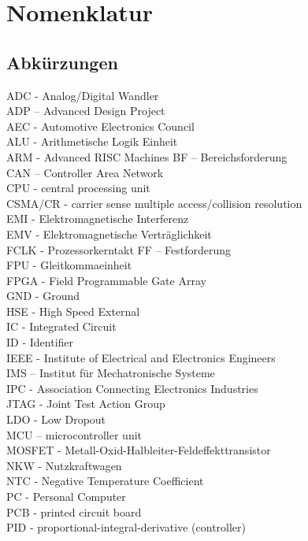 \chapter*{Nomenklatur}
\section*{Abkürzungen}
ADC - Analog/Digital Wandler\\
ADP – Advanced Design Project\\
AEC - Automotive Electronics Council\\
ALU - Arithmetische Logik Einheit\\
ARM - Advanced RISC Machines
BF – Bereichsforderung\\
CAN – Controller Area Network\\
CPU - central processing unit\\
CSMA/CR - carrier sense multiple access/collision resolution\\
EMI - Elektromagnetische Interferenz\\
EMV - Elektromagnetische Verträglichkeit\\
FCLK - Prozessorkerntakt
FF – Festforderung\\
FPU - Gleitkommaeinheit\\
FPGA - Field Programmable Gate Array\\
GND - Ground\\
HSE - High Speed External\\
IC - Integrated Circuit\\
ID - Identifier\\
IEEE - Institute of Electrical and Electronics Engineers\\
IMS – Institut für Mechatronische Systeme\\
IPC - Association Connecting Electronics Industries\\
JTAG - Joint Test Action Group\\
LDO - Low Dropout\\
MCU – microcontroller unit\\
MOSFET - Metall-Oxid-Halbleiter-Feldeffekttransistor\\
NKW - Nutzkraftwagen\\
NTC - Negative Temperature Coefficient\\
PC - Personal Computer\\
PCB - printed circuit board\\
PID - proportional-integral-derivative (controller)\\
